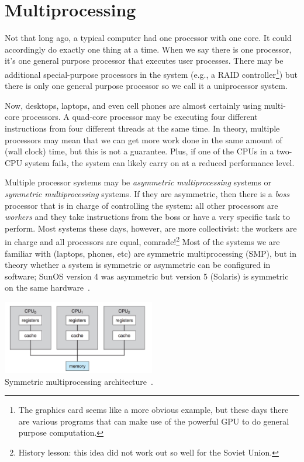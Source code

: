 




\section*{Multiprocessing}

Not that long ago, a typical computer had one processor with one core. It could accordingly do exactly one thing at a time. When we say there is one processor, it's one general purpose processor that executes user processes. There may be additional special-purpose processors in the system (e.g., a RAID controller\footnote{The graphics card seems like a more obvious example, but these days there are various programs that can make use of the powerful GPU to do general purpose computation.}) but there is only one general purpose processor so we call it a uniprocessor system.

Now, desktops, laptops, and even cell phones are almost certainly using multi-core processors. A quad-core processor may be executing four different instructions from four different threads at the same time. In theory, multiple processors may mean that we can get more work done in the same amount of (wall clock) time, but this is not a guarantee. Plus, if one of the CPUs in a two-CPU system fails, the system can likely carry on at a reduced performance level.

Multiple processor systems may be \textit{asymmetric multiprocessing} systems or \textit{symmetric multiprocessing} systems. If they are asymmetric, then there is a \textit{boss} processor that is in charge of controlling the system: all other processors are \textit{workers} and they take instructions from the boss or have a very specific task to perform. Most systems these days, however, are more collectivist: the workers are in charge and all processors are equal, comrade!\footnote{History lesson: this idea did not work out so well for the Soviet Union.} Most of the systems we are familiar with (laptops, phones, etc) are symmetric multiprocessing (SMP), but in theory whether a system is symmetric or asymmetric can be configured in software; SunOS version 4 was asymmetric but version 5 (Solaris) is symmetric on the same hardware~\cite{osc}.


\begin{center}
	\includegraphics[width=0.5\textwidth]{images/smp-architecture.png}\\
	Symmetric multiprocessing architecture~\cite{osc}.
\end{center}

